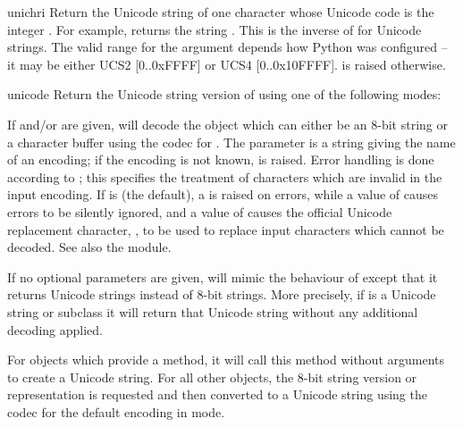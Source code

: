 \begin{funcdesc}{unichr}{i}
  Return the Unicode string of one character whose Unicode code is the
  integer .  For example,  returns the string
  .  This is the inverse of  for Unicode
  strings.  The valid range for the argument depends how Python was
  configured -- it may be either UCS2 [0..0xFFFF] or UCS4 [0..0x10FFFF].
   is raised otherwise.
\end{funcdesc}

\begin{funcdesc}{unicode}{}
  Return the Unicode string version of  using one of the
  following modes:

  If  and/or  are given, 
  will decode the object which can either be an 8-bit string or a
  character buffer using the codec for . The
   parameter is a string giving the name of an encoding;
  if the encoding is not known,  is raised.
  Error handling is done according to ; this specifies the
  treatment of characters which are invalid in the input encoding.  If
   is  (the default), a
   is raised on errors, while a value of
   causes errors to be silently ignored, and a value of
   causes the official Unicode replacement character,
  , to be used to replace input characters which cannot
  be decoded.  See also the  module.

  If no optional parameters are given,  will mimic the
  behaviour of  except that it returns Unicode strings
  instead of 8-bit strings. More precisely, if  is a
  Unicode string or subclass it will return that Unicode string without
  any additional decoding applied.

  For objects which provide a  method, it will
  call this method without arguments to create a Unicode string. For
  all other objects, the 8-bit string version or representation is
  requested and then converted to a Unicode string using the codec for
  the default encoding in  mode.

\end{funcdesc}

